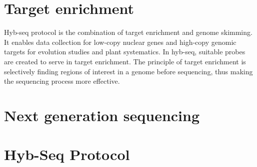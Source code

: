 \section{Target enrichment}
Hyb-seq protocol is the combination of target enrichment and genome skimming. It enables data collection for low-copy nuclear genes and high-copy genomic targets for 
evolution studies and plant systematics. In hyb-seq, suitable probes are created to serve in target enrichment. %
The principle of target enrichment is selectively finding regions of interest in a genome before sequencing, thus making the sequencing process more effective. %

\cite{sang2002utility}

\section{Next generation sequencing}

\section{Hyb-Seq Protocol}


